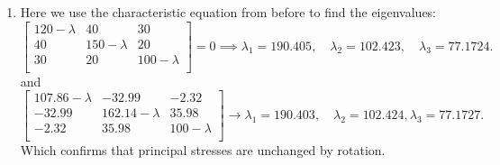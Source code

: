 \begin{derivation}
\begin{enumerate}[label=(\alph*)]
    \item Here we use the characteristic equation from before to find the eigenvalues:
      \begin{equation*}
        \begin{bmatrix}
          120 - \lambda & 40 & 30\\
        40 & 150 -\lambda & 20\\
        30 & 20 & 100 - \lambda\\
    \end{bmatrix} = 0 \implies \lambda_1 = \num{190.405}, \quad \lambda_2 = \num{102.423}, \quad \lambda_3 = \num{77.1724}
      .\end{equation*}
      and
      \begin{equation*}
        \begin{bmatrix}
          \num{107,86} -\lambda  & -\num{32,99}  & -\num{2,32} \\
        -\num{32,99}  & \num{162,14} -\lambda  & \num{35,98} \\
        -\num{2,32}  & \num{35,98}  & 100 -\lambda\\
    \end{bmatrix} \rightarrow \lambda_1 = \num{190.403}, \quad \lambda_2 = \num{102.424}, \lambda_3 = {77.1727}
      .\end{equation*}
      Which confirms that principal stresses are unchanged by rotation.


\end{enumerate}
\end{derivation}
